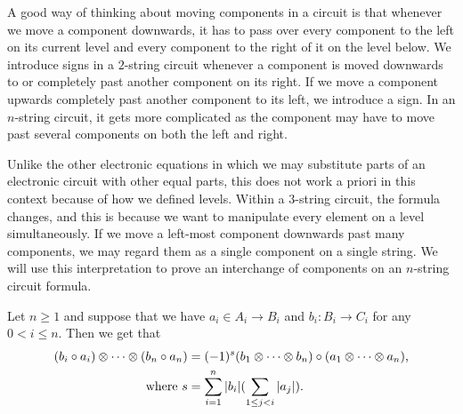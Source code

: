 \documentclass[../thesis.tex]{subfiles}
\begin{document}
            A good way of thinking about moving components in a circuit is that whenever we move a component downwards, it has to pass over every component to the left on its current level and every component to the right of it on the level below. We introduce signs in a $2$-string circuit whenever a component is moved downwards to or completely past another component on its right. If we move a component upwards completely past another component to its left, we introduce a sign. In an $n$-string circuit, it gets more complicated as the component may have to move past several components on both the left and right.

            Unlike the other electronic equations in which we may substitute parts of an electronic circuit with other equal parts, this does not work a priori in this context because of how we defined levels. Within a $3$-string circuit, the formula changes, and this is because we want to manipulate every element on a level simultaneously. If we move a left-most component downwards past many components, we may regard them as a single component on a single string. We will use this interpretation to prove an interchange of components on an $n$-string circuit formula.
            
            \begin{proposition}\label{prop: multi-koszul-sign}
                Let $n \geq 1$ and suppose that we have $a_i\in A_i \rightarrow B_i$ and $b_i: B_i \rightarrow C_i$ for any $0 < i \leq n $. Then we get that
                \begin{align*}
                    (b_i\circ a_i) \otimes \cdots \otimes (b_n \circ a_n) & = (-1)^s(b_1 \otimes \cdots \otimes b_n)\circ (a_1 \otimes \cdots \otimes a_n)\tt{,} \\
                    \tt{where } s & = \sum_{i=1}^n|b_i|(\sum_{1\leq j < i}|a_j|)\tt{.}
                \end{align*}
            \end{proposition}
\end{document}
